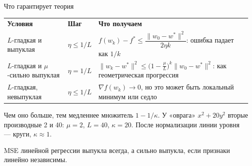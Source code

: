 \begin{frame}[c]{Что гарантирует теория}
  \centering
  \small
  \begin{tabular}{>{\raggedright\arraybackslash}p{4.2cm}>{\raggedright\arraybackslash}p{1.6cm}>{\raggedright\arraybackslash}p{6.6cm}}
    \textbf{Условия} & \textbf{Шаг} & \textbf{Что получаем}\\
    $L$-гладкая и выпуклая & $\eta \le 1/L$ & $f(w_k) - f^* \le \dfrac{\lVert w_0 - w^*\rVert^2}{2\eta k}$: ошибка падает как $1/k$\\
    $L$-гладкая и $\mu$-сильно выпуклая & $\eta = 1/L$ & $\lVert w_k - w^*\rVert^2 \le \bigl(1 - \tfrac{\mu}{L}\bigr)^k \lVert w_0 - w^*\rVert^2$: как геометрическая прогрессия\\
    $L$-гладкая, невыпуклая & $\eta \le 1/L$ & $\nabla f(w_k) \to 0$, но это может быть локальный минимум или седло\\
  \end{tabular}

  \medskip
  \raggedright\small
   Чем оно больше, тем медленнее множитель $1 - 1/\kappa$.
  У «оврага» $x^2 + 20y^2$ вторые производные 2 и 40: $\mu = 2$, $L = 40$, $\kappa = 20$.
  После нормализации линии уровня --- круги, $\kappa \approx 1$.

  \medskip
  {\footnotesize\color{acGray}MSE линейной регрессии выпукла всегда, а сильно выпукла,
  если признаки линейно независимы.\par}
\end{frame}
